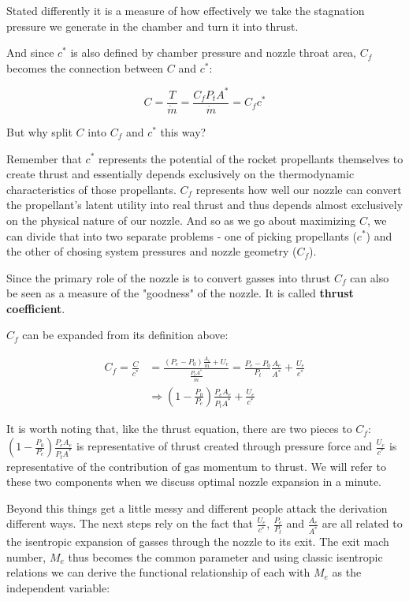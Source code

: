 \documentclass[twocolumn]{memoir} %
\begin{document}
Stated differently it is a measure of how effectively we take the
stagnation pressure we generate in the chamber and turn it into thrust.

And since \(c^*\) is also defined by chamber pressure and nozzle throat
area, \(C_f\) becomes the connection between \(C\) and \(c^*\):

\begin{equation}
    C = \frac{T}{\dot{m}} = \frac{C_f P_t A^*}{\dot{m}} = C_f c^*
    \label{eq:C}
\end{equation}

But why split \(C\) into \(C_f\) and \(c^*\) this way?

Remember that \(c^*\) represents the potential of the rocket propellants
themselves to create thrust and essentially depends exclusively on the
thermodynamic characteristics of those propellants. \(C_f\) represents
how well our nozzle can convert the propellant's latent utility into
real thrust and thus depends almost exclusively on the physical nature
of our nozzle. And so as we go about maximizing \(C\), we can divide
that into two separate problems - one of picking propellants (\(c^*\))
and the other of chosing system pressures and nozzle geometry (\(C_f\)).

Since the primary role of the nozzle is to convert gasses into thrust
\(C_f\) can also be seen as a measure of the "goodness" of the nozzle.
It is called \textbf{thrust coefficient}.

\(C_f\) can be expanded from its definition above:

\begin{equation}
    \begin{split}
        C_f = \frac{C}{c^*} &= \frac{(P_e - P_0)\frac{A_e}{\dot{m}} + U_e}{\frac{P_t A^*}{\dot{m}}} = \frac{P_e - P_0}{P_t}\frac{A_e}{A^*} + \frac{U_e}{c^*} \\
        & \Rightarrow \left(1 - \frac{P_0}{P_e}\right)\frac{P_e A_e}{P_t A^*} + \frac{U_e}{c^*}
    \end{split}
\end{equation}

It is worth noting that, like the thrust equation, there are two pieces
to \(C_f\): $\left(1 - \frac{P_0}{P_e}\right)\frac{P_e A_e}{P_t A^*}$ is representative
of thrust created through pressure force and \(\frac{U_e}{c^*}\) is
representative of the contribution of gas momentum to thrust. We will
refer to these two components when we discuss optimal nozzle expansion
in a minute.

Beyond this things get a little messy and different people attack the
derivation different ways. The next steps rely on the fact that  
\(\frac{U_e}{c^*}\), \(\frac{P_e}{P_t}\) and \(\frac{A_e}{A^*}\) are all
related to the isentropic expansion of gasses through the nozzle to its
exit. The exit mach number, \(M_e\) thus becomes the common parameter
and using classic isentropic relations we can derive the functional
relationship of each with \(M_e\) as the independent variable:
\end{document}
